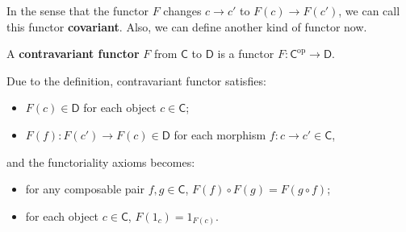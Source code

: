 In the sense that the functor $F$ changes $c\rightarrow c'$ to $F(c)\rightarrow F(c')$, we can call this functor \textbf{covariant}. Also, we can define another kind of functor now.
\begin{defn} A \textbf{contravariant functor} $F$ from $\mathsf{C}$ to $\mathsf{D}$ is a functor $F:\mathsf{C}^{\mathrm{op}}\rightarrow \mathsf{D}$.
\end{defn}
Due to the definition, contravariant functor satisfies:
\begin{itemize}
\item $F(c)\in \mathsf{D}$ for each object $c\in\mathsf{C}$;
\item $F(f):F(c')\rightarrow F(c)\in \mathsf{D}$ for each morphism $f:c\rightarrow c'\in\mathsf{C}$,
\end{itemize}
and the functoriality axioms becomes:
\begin{itemize}
\item for any composable pair $f,g\in\mathsf{C}$, $F(f)\circ F(g)=F(g\circ f)$;
\item for each object $c\in\mathsf{C}$, $F(1_c)=1_{F(c)}$.
\end{itemize}
